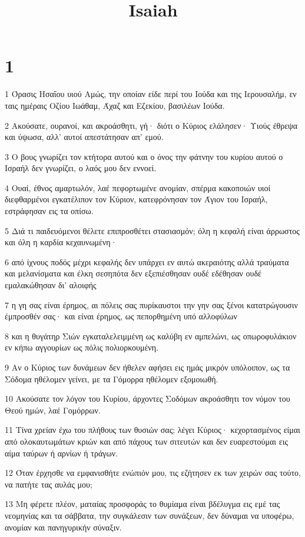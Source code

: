 

\title{Isaiah}


\chapter{1}

\par 1 Όρασις Ησαΐου υιού Αμώς, την οποίαν είδε περί του Ιούδα και της Ιερουσαλήμ, εν ταις ημέραις Οζίου Ιωάθαμ, Άχαζ και Εζεκίου, βασιλέων Ιούδα.
\par 2 Ακούσατε, ουρανοί, και ακροάσθητι, γή· διότι ο Κύριος ελάλησεν· Υιούς έθρεψα και ύψωσα, αλλ' αυτοί απεστάτησαν απ' εμού.
\par 3 Ο βους γνωρίζει τον κτήτορα αυτού και ο όνος την φάτνην του κυρίου αυτού ο Ισραήλ δεν γνωρίζει, ο λαός μου δεν εννοεί.
\par 4 Ουαί, έθνος αμαρτωλόν, λαέ πεφορτωμένε ανομίαν, σπέρμα κακοποιών υιοί διεφθαρμένοι εγκατέλιπον τον Κύριον, κατεφρόνησαν τον Άγιον του Ισραήλ, εστράφησαν εις τα οπίσω.
\par 5 Διά τι παιδευόμενοι θέλετε επιπροσθέτει στασιασμόν; όλη η κεφαλή είναι άρρωστος και όλη η καρδία κεχαυνωμένη·
\par 6 από ίχνους ποδός μέχρι κεφαλής δεν υπάρχει εν αυτώ ακεραιότης αλλά τραύματα και μελανίσματα και έλκη σεσηπότα δεν εξεπιέσθησαν ουδέ εδέθησαν ουδέ εμαλακώθησαν δι' αλοιφής
\par 7 η γη σας είναι έρημος, αι πόλεις σας πυρίκαυστοι την γην σας ξένοι κατατρώγουσιν έμπροσθέν σας· και είναι έρημος, ως πεπορθημένη υπό αλλοφύλων
\par 8 και η θυγάτηρ Σιών εγκαταλελειμμένη ως καλύβη εν αμπελώνι, ως οπωροφυλάκιον εν κήπω αγγουρίων ως πόλις πολιορκουμένη.
\par 9 Αν ο Κύριος των δυνάμεων δεν ήθελεν αφήσει εις ημάς μικρόν υπόλοιπον, ως τα Σόδομα ηθέλομεν γείνει, με τα Γόμορρα ηθέλομεν εξομοιωθή.
\par 10 Ακούσατε τον λόγον του Κυρίου, άρχοντες Σοδόμων ακροάσθητι τον νόμον του Θεού ημών, λαέ Γομόρρων.
\par 11 Τίνα χρείαν έχω του πλήθους των θυσιών σας; λέγει Κύριος· κεχορτασμένος είμαι από ολοκαυτωμάτων κριών και από πάχους των σιτευτών και δεν ευαρεστούμαι εις αίμα ταύρων ή αρνίων ή τράγων.
\par 12 Όταν έρχησθε να εμφανισθήτε ενώπιόν μου, τις εζήτησεν εκ των χειρών σας τούτο, να πατήτε τας αυλάς μου;
\par 13 Μη φέρετε πλέον, ματαίας προσφοράς το θυμίαμα είναι βδέλυγμα εις εμέ τας νεομηνίας και τα σάββατα, την συγκάλεσιν των συνάξεων, δεν δύναμαι να υποφέρω, ανομίαν και πανηγυρικήν σύναξιν.
